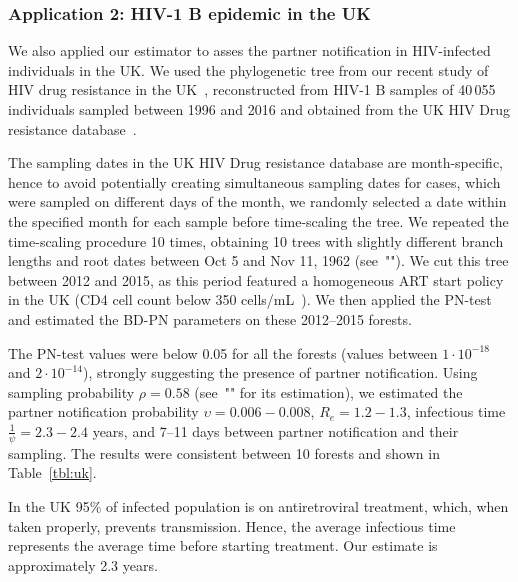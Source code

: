 \documentclass[10pt,letterpaper]{article}
\begin{document}
\subsubsection*{Application 2: HIV-1 B epidemic in the UK}
We also applied our estimator to asses the partner notification in HIV-infected individuals in the UK. We used the phylogenetic tree from our recent study of HIV drug resistance in the UK~\cite{zhukovaModelingDrugResistance2023}, reconstructed from HIV-1 B samples of 40\,055 individuals sampled between 1996 and 2016 and obtained from the UK HIV Drug resistance database~\cite{Dunn2007}. 

The sampling dates in the UK HIV Drug resistance database are month-specific, hence to avoid potentially creating simultaneous sampling dates for cases, which were sampled on different days of the month, we randomly selected a date within the specified month for each sample before time-scaling the tree. We repeated the time-scaling procedure 10 times, obtaining 10 trees with slightly different branch lengths and root dates between Oct 5 and Nov 11, 1962 (see~""). We cut this tree between 2012 and 2015, as this period featured a homogeneous ART start policy in the UK (CD4 cell count below 350 cells/mL~\cite{williamsBritishHIVAssociation2012}). We then applied the PN-test and estimated the BD-PN parameters on these 2012--2015 forests. 

The PN-test values were below 0.05 for all the forests (values between $1 \cdot 10^{-18}$ and $2 \cdot 10^{-14}$), strongly suggesting the presence of partner notification. Using sampling probability $\rho=0.58$ (see~"" for its estimation), we estimated the partner notification probability $\upsilon=0.006-0.008$, %
$R_e = 1.2-1.3$, infectious time $\frac{1}{\psi} = 2.3-2.4$ years, and 7--11 days between partner notification and their sampling. The results were consistent between 10 forests and shown in Table~\ref{tbl:uk}. %
 
In the UK 95\% of infected population is on antiretroviral treatment, which, when taken properly, prevents transmission. Hence, the average infectious time represents the average time before starting treatment. Our estimate is approximately 2.3 years. 
\end{document}
